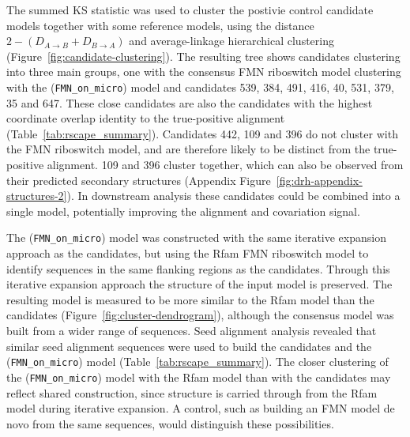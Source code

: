 The summed \ac{KS} statistic was used to cluster the postivie control candidate models together with some reference models, using the distance $2 - (D_{A \rightarrow B} + D_{B \rightarrow A})$ and average-linkage hierarchical clustering (Figure~\ref{fig:candidate-clustering}). 
The resulting tree shows candidates clustering into three main groups, one with the consensus FMN riboswitch model clustering with the (\texttt{FMN\_on\_micro}) model and candidates 539, 384, 491, 416, 40, 531, 379, 35 and 647.
These close candidates are also the candidates with the highest coordinate overlap identity to the true-positive alignment (Table~\ref{tab:rscape_summary}).
Candidates 442, 109 and 396 do not cluster with the FMN riboswitch model, and are therefore likely to be distinct from the true-positive alignment.
109 and 396 cluster together, which can also be observed from their predicted secondary structures (Appendix Figure~\ref{fig:drh-appendix-structures-2}).
In downstream analysis these candidates could be combined into a single model, potentially improving the alignment and covariation signal.

The (\texttt{FMN\_on\_micro}) model was constructed with the same iterative expansion approach as the candidates, but using the Rfam \ac{FMN} riboswitch model to identify sequences in the same flanking regions as the candidates.
Through this iterative expansion approach the structure of the input model is preserved.
The resulting model is measured to be more similar to the Rfam model than the candidates (Figure~\ref{fig:cluster-dendrogram}), although the consensus model was built from a wider range of sequences.
Seed alignment analysis revealed that similar seed alignment sequences were used to build the candidates and the (\texttt{FMN\_on\_micro}) model (Table~\ref{tab:rscape_summary}).
The closer clustering of the (\texttt{FMN\_on\_micro}) model with the Rfam model than with the candidates may reflect shared construction, since structure is carried through from the Rfam model during iterative expansion.
A control, such as building an \ac{FMN} model de novo from the same sequences, would distinguish these possibilities.

